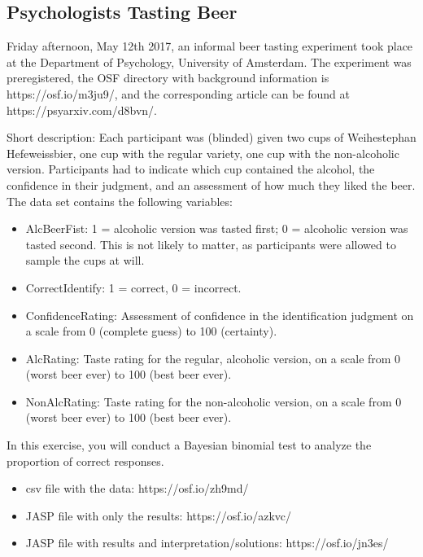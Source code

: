 \documentclass[
  letterpaper,
  DIV=11,
  numbers=noendperiod]{scrreprt}
\providecommand{\tightlist}{%
  \setlength{\itemsep}{0pt}\setlength{\parskip}{0pt}}\usepackage{longtable,booktabs,array}
\begin{document}
\hypertarget{psychologists-tasting-beer}{%
\subsection{Psychologists Tasting
Beer}\label{psychologists-tasting-beer}}

Friday afternoon, May 12th 2017, an informal beer tasting experiment
took place at the Department of Psychology, University of Amsterdam. The
experiment was preregistered, the OSF directory with background
information is https://osf.io/m3ju9/, and the corresponding article can
be found at https://psyarxiv.com/d8bvn/.

Short description: Each participant was (blinded) given two cups of
Weihestephan Hefeweissbier, one cup with the regular variety, one cup
with the non-alcoholic version. Participants had to indicate which cup
contained the alcohol, the confidence in their judgment, and an
assessment of how much they liked the beer. The data set contains the
following variables:

\begin{itemize}
\tightlist
\item
  AlcBeerFist: 1 = alcoholic version was tasted first; 0 = alcoholic
  version was tasted second. This is not likely to matter, as
  participants were allowed to sample the cups at will.
\item
  CorrectIdentify: 1 = correct, 0 = incorrect.
\item
  ConfidenceRating: Assessment of confidence in the identification
  judgment on a scale from 0 (complete guess) to 100 (certainty).
\item
  AlcRating: Taste rating for the regular, alcoholic version, on a scale
  from 0 (worst beer ever) to 100 (best beer ever).
\item
  NonAlcRating: Taste rating for the non-alcoholic version, on a scale
  from 0 (worst beer ever) to 100 (best beer ever).
\end{itemize}

In this exercise, you will conduct a Bayesian binomial test to analyze
the proportion of correct responses.

\begin{itemize}
\tightlist
\item
  csv file with the data: https://osf.io/zh9md/
\item
  JASP file with only the results: https://osf.io/azkvc/
\item
  JASP file with results and interpretation/solutions:
  https://osf.io/jn3es/
\end{itemize}
\end{document}
